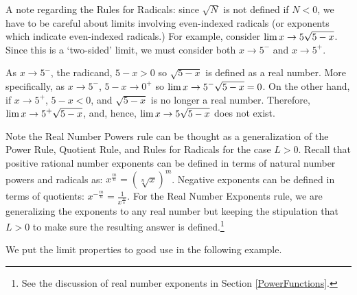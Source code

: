 \medskip

A note regarding the Rules for Radicals:  since $\sqrt{N}$ is not defined if $N<0$, we have to be careful about limits involving even-indexed radicals (or exponents which indicate even-indexed radicals.)   For example, consider $\displaystyle{\lim{x \rightarrow 5} \sqrt{5-x}}$.  Since this is a `two-sided' limit, we must consider both $x \rightarrow 5^{-}$ and $x \rightarrow 5^{+}$.

\medskip

As $x \rightarrow 5^{-}$, the radicand, $5-x >0$ so $\sqrt{5-x}$ is defined as a real number.  More specifically, as $x \rightarrow 5^{-}$, $5-x \rightarrow 0^{+}$ so $\displaystyle{\lim{x \rightarrow 5^{-}} \sqrt{5-x} = 0}$.  On the other hand, if $x \rightarrow 5^{+}$, $5-x < 0$, and $\sqrt{5-x}$ is no longer a real number.  Therefore, $\displaystyle{\lim{x \rightarrow 5^{+}} \sqrt{5-x}}$, and, hence, $\displaystyle{\lim{x \rightarrow 5} \sqrt{5-x}}$ does not exist.

\medskip

Note the Real Number Powers rule can be thought as a generalization of the Power Rule, Quotient Rule, and  Rules for Radicals for the case $L>0$. Recall that positive rational number exponents can be defined in terms of natural number powers and radicals as:  $x^{\frac{m}{n}} = \left( \sqrt[n]{x}\right)^{m}$.  Negative exponents can be defined in terms of quotients:  $x^{-\frac{m}{n}} = \frac{1}{x^{\frac{m}{n}}}$.  For the Real Number Exponents rule, we are generalizing the exponents to any real number but keeping the stipulation that $L>0$ to make sure the resulting answer is defined.\footnote{See the discussion of real number exponents in  Section \ref{PowerFunctions}.}

\medskip

We put the limit properties to good use in the following example.

\pagebreak

